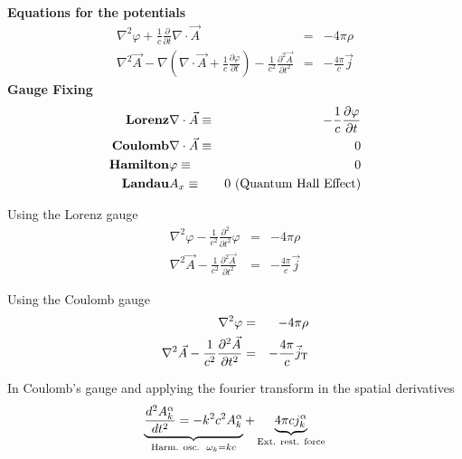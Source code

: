\documentclass[12pt,a4paper]{article}
\begin{document}
\textbf{Equations for the potentials}
\begin{eqnarray}
	\nabla^2 \varphi + \frac{1}{c}\frac{\partial}{\partial t}\nabla\cdot \vec{A} & = & -4\pi\rho \\	
	\nabla^2\vec{A} - \nabla \left( \nabla\cdot \vec{A}+ \frac{1}{c}\frac{\partial \varphi}{\partial t}\right)-\frac{1}{c^2}\frac{\partial^2  \vec{A}}{\partial t^2} & = & -\frac{4\pi}{c}\vec{j}
\end{eqnarray}
\textbf{Gauge Fixing}
\begin{eqnarray}
	\text{\textbf{Lorenz}}& \nabla \cdot \vec{A} \equiv & - \frac{1}{c}\frac{\partial \varphi}{\partial t} \\
	\text{\textbf{Coulomb}}& \nabla \cdot \vec{A} \equiv & 0\\
	\text{\textbf{Hamilton}} & \varphi \equiv & 0 \\
	\text{\textbf{Landau}} & A_x \equiv & 0 \text{ (Quantum Hall Effect)}
\end{eqnarray}

Using the Lorenz gauge
\begin{eqnarray}
\nabla^2 \varphi - \frac{1}{c^2}\frac{\partial^2}{\partial t^2}\varphi & = & -4\pi\rho \\	
	\nabla^2\vec{A}-\frac{1}{c^2}\frac{\partial^2  \vec{A}}{\partial t^2} & = & -\frac{4\pi}{c}\vec{j}
\end{eqnarray} 

Using the Coulomb gauge
\begin{eqnarray}
\nabla^2 \varphi  & = & -4\pi\rho \\	
	\nabla^2\vec{A}-\frac{1}{c^2}\frac{\partial^2  \vec{A}}{\partial t^2} & = & -\frac{4\pi}{c}\vec{j}_{\rm  T}
\end{eqnarray} 

In Coulomb's gauge and applying the fourier transform in the spatial derivatives
\begin{equation}
	\underbrace{\frac{d^2 A_k^{\alpha}}{dt^2}= -k^2c^2 A_k^{\alpha}}_{\text{Harm. osc.} \\ \omega_k = kc}  +  \underbrace{4\pi c j_k^{\alpha}}_{\text{Ext. rest. force}}
\end{equation}
\end{document}
